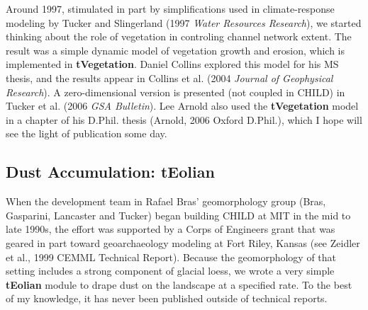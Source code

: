 \documentclass[12pt]{article}
\begin{document}
Around 1997, stimulated in part by simplifications used in climate-response
modeling by Tucker and Slingerland (1997 {\em Water Resources Research}), we started thinking about the role
of vegetation in controling channel network extent. The result was a simple
dynamic model of vegetation growth and erosion, which is implemented in
{\bf tVegetation}. Daniel Collins explored this model for his MS thesis, 
and the results appear in Collins et al. (2004 {\em Journal of Geophysical Research}). A zero-dimensional version
is presented (not coupled in CHILD) in Tucker et al. (2006 {\em GSA Bulletin}). Lee Arnold also
used the {\bf tVegetation} model in a chapter of his D.Phil. thesis
(Arnold, 2006 Oxford D.Phil.), which I hope will see the light of publication some day.

\subsection{Dust Accumulation: tEolian}

When the development team in Rafael Bras' geomorphology group (Bras, Gasparini, Lancaster and Tucker) began building CHILD at MIT in the mid to late 1990s, 
the effort was supported by a Corps of Engineers grant that was geared in part toward
geoarchaeology modeling at Fort Riley, Kansas (see Zeidler et al., 1999 CEMML Technical Report).
Because the geomorphology of that setting includes a strong component of 
glacial loess, we wrote a very simple {\bf tEolian} module to drape dust on
the landscape at a specified rate. To the best of my knowledge, it has 
never been published outside of technical reports.
\end{document}
